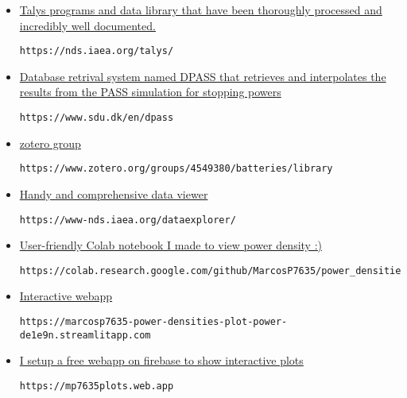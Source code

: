 \documentclass[12pt]{article}
\begin{document}
\begin{itemize}
\item \href{https://nds.iaea.org/talys/
}{Talys programs and data library that have been thoroughly processed and incredibly well documented.}
\begin{lstlisting}[breaklines]
https://nds.iaea.org/talys/
\end{lstlisting}


\item \href{https://www.sdu.dk/en/dpass
}{Database retrival system named DPASS that retrieves and interpolates the results from the PASS simulation for stopping powers}
\begin{lstlisting}[breaklines]
https://www.sdu.dk/en/dpass
\end{lstlisting}

\item \href{https://www.zotero.org/groups/4549380/batteries/library
}{zotero group}
\begin{lstlisting}[breaklines]
https://www.zotero.org/groups/4549380/batteries/library
\end{lstlisting}

\item \href{https://www-nds.iaea.org/dataexplorer/
}{Handy and comprehensive data viewer}
\begin{lstlisting}[breaklines]
https://www-nds.iaea.org/dataexplorer/
\end{lstlisting}

\item \href{https://colab.research.google.com/github/MarcosP7635/power_densities/blob/main/Plot_power.ipynb
}{User-friendly Colab notebook I made to view power density :)}
\begin{lstlisting}[breaklines]
https://colab.research.google.com/github/MarcosP7635/power_densities/blob/main/Plot_power.ipynb
\end{lstlisting}

\item \href{https://marcosp7635-power-densities-plot-power-de1e9n.streamlitapp.com/}{Interactive webapp}
\begin{lstlisting}[breaklines]
https://marcosp7635-power-densities-plot-power-de1e9n.streamlitapp.com
\end{lstlisting}

\item \href{https://mp7635plots.web.app}{I setup a free webapp on firebase to show interactive plots}
\begin{lstlisting}[breaklines]
https://mp7635plots.web.app
\end{lstlisting}


\end{itemize}
\end{document}
